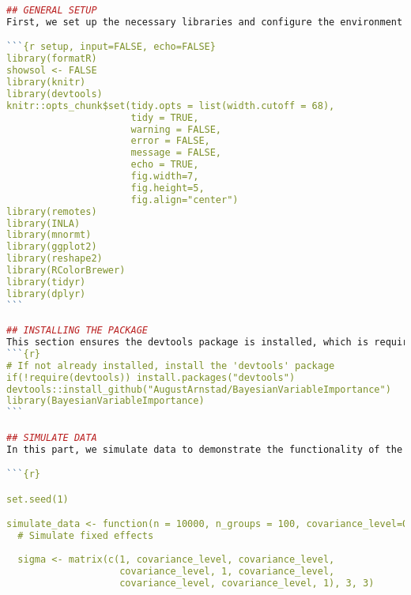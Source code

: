 
\begin{lstlisting}[language=R, caption=Usage of the BayesianImpGLMM package with plots and examples.]
## GENERAL SETUP
First, we set up the necessary libraries and configure the environment for our analysis. This includes loading essential packages and setting options for chunk output and plot dimensions.

```{r setup, input=FALSE, echo=FALSE}
library(formatR)
showsol <- FALSE
library(knitr)
library(devtools)
knitr::opts_chunk$set(tidy.opts = list(width.cutoff = 68), 
                      tidy = TRUE, 
                      warning = FALSE, 
                      error = FALSE, 
                      message = FALSE, 
                      echo = TRUE, 
                      fig.width=7, 
                      fig.height=5, 
                      fig.align="center")
library(remotes)
library(INLA)
library(mnormt)
library(ggplot2)
library(reshape2)
library(RColorBrewer)
library(tidyr)
library(dplyr)
```

## INSTALLING THE PACKAGE
This section ensures the devtools package is installed, which is required for installing packages from GitHub. We then install the BayesianVariableImportance package directly from GitHub using devtools::install_github(). In the package under the Hello.R file, all functions are defined with corresponding documentation.
```{r}
# If not already installed, install the 'devtools' package
if(!require(devtools)) install.packages("devtools")
devtools::install_github("AugustArnstad/BayesianVariableImportance")
library(BayesianVariableImportance)
```

## SIMULATE DATA
In this part, we simulate data to demonstrate the functionality of the BayesianVariableImportance package. We generate random variables used as fixed effects with different correlation structures and random effects. Note that the coefficients used here are a bit large for the Poisson model, consider lowering them. The data is then structured into data frames for further analysis. If you have a suitable dataset you can use this instead.

```{r}

set.seed(1)

simulate_data <- function(n = 10000, n_groups = 100, covariance_level=0) {
  # Simulate fixed effects
  
  sigma <- matrix(c(1, covariance_level, covariance_level, 
                    covariance_level, 1, covariance_level, 
                    covariance_level, covariance_level, 1), 3, 3)
  

\end{lstlisting}
